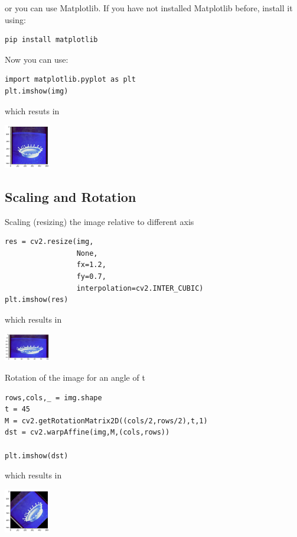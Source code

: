 or you can use Matplotlib. If you have not installed Matplotlib before,
install it using:

\begin{verbatim}
pip install matplotlib
\end{verbatim}

Now you can use:

\begin{verbatim}
import matplotlib.pyplot as plt
plt.imshow(img)
\end{verbatim}

which resuts in 

\includegraphics[width=0.15\textwidth]{opencv_files/output_5_1.png}


\subsection{Scaling and Rotation}\label{scaling-and-rotation}

Scaling (resizing) the image relative to different axis

\begin{verbatim}
res = cv2.resize(img,
                 None,
                 fx=1.2, 
                 fy=0.7, 
                 interpolation=cv2.INTER_CUBIC)
plt.imshow(res)
\end{verbatim}

which results in 

\includegraphics[width=0.15\textwidth]{opencv_files/output_7_1.png}


Rotation of the image for an angle of t

\begin{verbatim}
rows,cols,_ = img.shape
t = 45
M = cv2.getRotationMatrix2D((cols/2,rows/2),t,1)
dst = cv2.warpAffine(img,M,(cols,rows))

plt.imshow(dst)
\end{verbatim}

which results in 

\includegraphics[width=0.15\textwidth]{opencv_files/output_9_1.png}

